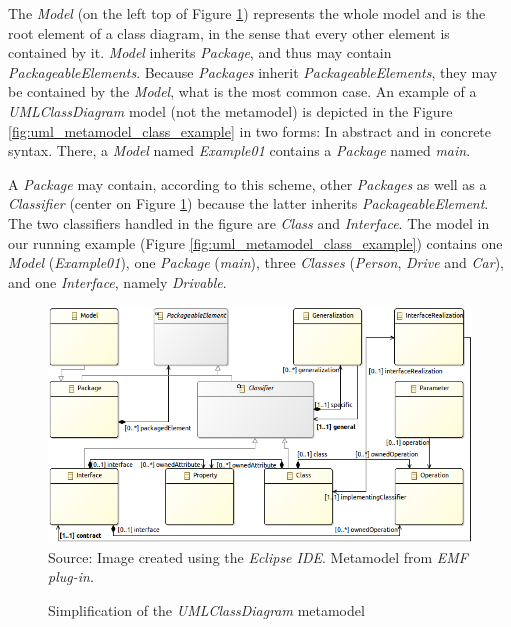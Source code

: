 \documentclass[tuberlin,cic,tc,english,noabntcite,oneside]{iiufrgs}
\begin{document}
The \emph{Model} (on the left top of Figure \ref{fig:uml_metamodel_class}) represents the whole model and is the root element of a class diagram, in the sense that every other element is contained by it. \emph{Model} inherits \emph{Package}, and thus may contain \emph{PackageableElements}. Because \emph{Packages} inherit \emph{PackageableElements}, they may be contained by the \emph{Model}, what is the most common case. An example of a \emph{UMLClassDiagram} model (not the metamodel) is depicted in the Figure \ref{fig:uml_metamodel_class_example} in two forms: In abstract and in concrete syntax. There, a \emph{Model} named \emph{Example01} contains a \emph{Package} named \emph{main}.

A \emph{Package} may contain, according to this scheme, other \emph{Packages} as well as a \emph{Classifier} (center on Figure \ref{fig:uml_metamodel_class}) because the latter inherits \emph{PackageableElement}. The two classifiers handled in the figure are \emph{Class} and \emph{Interface}. The model in our running example (Figure \ref{fig:uml_metamodel_class_example}) contains one \emph{Model} (\emph{Example01}), one \emph{Package} (\emph{main}), three \emph{Classes} (\emph{Person}, \emph{Drive} and \emph{Car}), and one \emph{Interface}, namely \emph{Drivable}.

\begin{figure}[H]
	\centering
    \caption{Simplification of the \emph{UMLClassDiagram} metamodel}
    \includegraphics[width=\textwidth]{umlClassDiagramSimple01} \\
    Source: Image created using the \emph{Eclipse IDE}. Metamodel from \emph{EMF plug-in}.
    \label{fig:uml_metamodel_class}
\end{figure}
\end{document}
